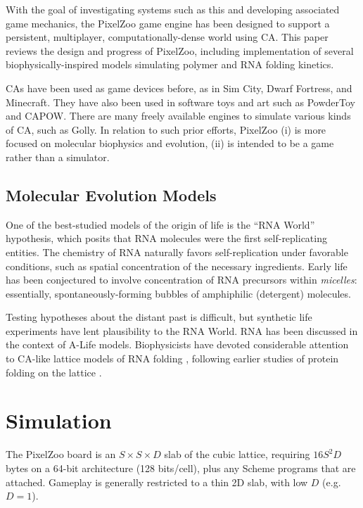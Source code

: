 \documentclass{acm_proc_article-sp}
\begin{document}
With the goal of investigating systems such as this and developing associated game mechanics,
the PixelZoo game engine has been designed to support
a persistent, multiplayer, computationally-dense world using CA.
This paper reviews the design and progress of PixelZoo,
including implementation of several biophysically-inspired models
simulating polymer and RNA folding kinetics.

CAs have been used as game devices before,
as in Sim City, %
Dwarf Fortress, %
and Minecraft. %
They have also been used in software toys and art such as
PowderToy %
and CAPOW. %
There are many freely available engines to simulate various kinds of CA, such as Golly. %
In relation to such prior efforts, PixelZoo
(i) is more focused on molecular biophysics and evolution,
(ii) is intended to be a game rather than a simulator.

\subsection{Molecular Evolution Models}

One of the best-studied models of the origin of life is the ``RNA World'' hypothesis,
which posits that RNA molecules were the first self-replicating entities\cite{Woese1967}.
The chemistry of RNA naturally favors self-replication under favorable conditions,
such as spatial concentration of the necessary ingredients.
Early life has been conjectured to involve concentration of RNA precursors within {\em micelles}:
essentially, spontaneously-forming bubbles of amphiphilic (detergent) molecules.

Testing hypotheses about the distant past is difficult, but synthetic life experiments
have lent plausibility to the RNA World\cite{PaulJoyce2002}.
RNA has been discussed in the context of A-Life models\cite{journals/alife/Schuster94}.
Biophysicists have devoted considerable attention to CA-like lattice models of RNA folding
\cite{LeoniVanderzande2003,JostEveraers2010,ZaraPretti2007,GillespieMayneJiang2009},
following earlier studies of protein folding on the lattice \cite{Dill1985,PandeRokhsar1999}.

\section{Simulation}

The PixelZoo board is
an $S \times S \times D$ slab of the cubic lattice,
requiring $16S^2 D$ bytes on a 64-bit architecture (128 bits/cell),
plus any Scheme programs that are attached.
Gameplay is generally restricted to a thin 2D slab, with low $D$ (e.g. $D=1$).
\end{document}
